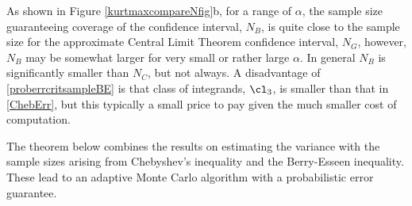 \documentclass[graybox]{svmult}
\begin{document}
As shown in Figure \ref{kurtmaxcompareNfig}b, for a range of $\alpha$, the sample size guaranteeing coverage of the confidence interval, $N_B$, is quite close to the sample size for the approximate Central Limit Theorem confidence interval, $N_G$, however, $N_B$ may be somewhat larger for very small or rather large $\alpha$.  In general $N_B$ is significantly smaller than $N_C$, but not always.  A disadvantage of \eqref{proberrcritsampleBE} is that class of integrands, $\cl_3$, is smaller than that in \eqref{ChebErr}, but this typically a small price to pay given the much smaller cost of computation.

The theorem below combines the results on estimating the variance with the sample sizes arising from Chebyshev's inequality and the Berry-Esseen inequality.  These lead to an adaptive Monte Carlo algorithm with a probabilistic error guarantee.
\end{document}

